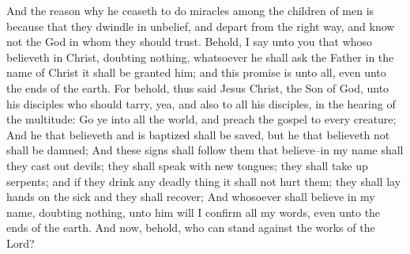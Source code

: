 And the reason why he ceaseth to do miracles among the children of men is because that they dwindle in unbelief, and depart from the right way, and know not the God in whom they should trust.
\bverse \iffalse Behold, I say unto you that whoso believeth in Christ, doubting nothing, whatsoever he shall ask the Father in the name of Christ it shall be granted him; and this promise is unto all, even unto the ends of the earth. \fi
Behold, I say unto you that whoso believeth in Christ, doubting nothing, whatsoever he shall ask the Father in the name of Christ it shall be granted him; and this promise is unto all, even unto the ends of the earth.
\bverse \iffalse For behold, thus said Jesus Christ, the Son of God, unto his disciples who should tarry, yea, and also to all his disciples, in the hearing of the multitude: Go ye into all the world, and preach the gospel to every creature; \fi
For behold, thus said Jesus Christ, the Son of God, unto his disciples who should tarry, yea, and also to all his disciples, in the hearing of the multitude: Go ye into all the world, and preach the gospel to every creature;
\bverse \iffalse And he that believeth and is baptized shall be saved, but he that believeth not shall be damned; \fi
And he that believeth and is baptized shall be saved, but he that believeth not shall be damned;
\bverse \iffalse And these signs shall follow them that believe--in my name shall they cast out devils; they shall speak with new tongues; they shall take up serpents; and if they drink any deadly thing it shall not hurt them; they shall lay hands on the sick and they shall recover; \fi
And these signs shall follow them that believe--in my name shall they cast out devils; they shall speak with new tongues; they shall take up serpents; and if they drink any deadly thing it shall not hurt them; they shall lay hands on the sick and they shall recover;
\bverse \iffalse And whosoever shall believe in my name, doubting nothing, unto him will I confirm all my words, even unto the ends of the earth. \fi
And whosoever shall believe in my name, doubting nothing, unto him will I confirm all my words, even unto the ends of the earth.
\bverse \iffalse And now, behold, who can stand against the works of the Lord? \fi
And now, behold, who can stand against the works of the Lord?


